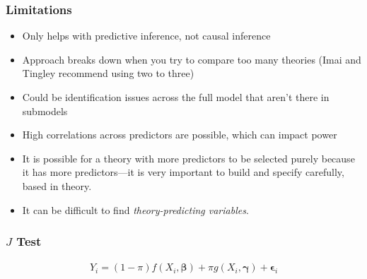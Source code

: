 \documentclass{beamer}
\begin{document}
\begin{frame}
\frametitle{Limitations}
\begin{itemize}
	\item Only helps with predictive inference, not causal inference
	\item Approach breaks down when you try to compare too many theories (Imai and Tingley recommend using two to three)
	\item Could be identification issues across the full model that aren't there in submodels
	\item High correlations across predictors are possible, which can impact power
	\item It is possible for a theory with more predictors to be selected purely because it has more predictors---it is very important to build and specify carefully, based in theory.
	\item It can be difficult to find \textit{theory-predicting variables}. 
\end{itemize}
\end{frame}



\begin{frame}
\frametitle{$J$ Test}
\begin{align}
Y_i = (1-\pi)f(X_i, \boldsymbol{\beta}) + \pi g(X_i, \boldsymbol{\gamma}) + \boldsymbol{\epsilon}_i
\end{align}
\end{frame}
\end{document}
